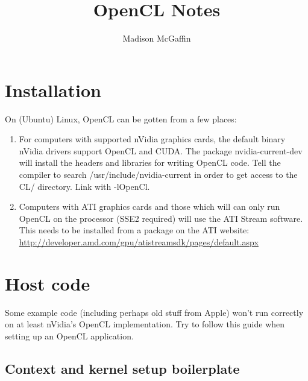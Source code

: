\documentclass{article}
\title{OpenCL Notes}
\author{Madison McGaffin}
\begin{document}
\maketitle

\tableofcontents

\section{Installation}
On (Ubuntu) Linux, OpenCL can be gotten from a few places:
\begin{enumerate}
  \item For computers with supported nVidia graphics cards, the default
    binary nVidia drivers support OpenCL and CUDA.  The package 
    nvidia-current-dev will install the headers and libraries for
    writing OpenCL code.  Tell the compiler to search 
    /usr/include/nvidia-current in order to get access to the CL/
    directory.  Link with -lOpenCl.
  \item Computers with ATI graphics cards and those which will can only
    run OpenCL on the processor (SSE2 required) will use the ATI
    Stream software.  This needs to be installed from a package on the
    ATI website: 
      \url{http://developer.amd.com/gpu/atistreamsdk/pages/default.aspx}
\end{enumerate}

\section{Host code}
Some example code (including perhaps old stuff from Apple) won't run
correctly on at least nVidia's OpenCL implementation.  Try to follow
this guide when setting up an OpenCL application.

\subsection{Context and kernel setup boilerplate}
\end{document}
